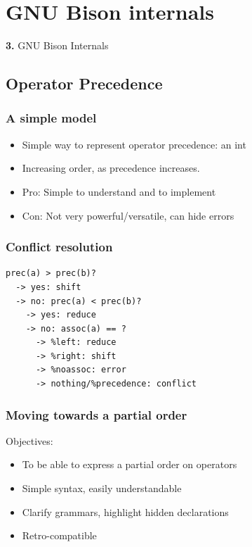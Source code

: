 \documentclass{beamer}
\begin{document}
\section{GNU Bison internals}

\begingroup
{}
\begin{frame}
    \begin{center}
        \vspace{1cm}
        {\Huge\color{black} \textbf{3.} { GNU Bison Internals}}
    \end{center}
\end{frame}
\endgroup

\subsection{Operator Precedence}
\begin{frame}
  \frametitle{A simple model}
    \begin{itemize}
      \item Simple way to represent operator precedence: an int
      \item Increasing order, as precedence increases.
      \item Pro: Simple to understand and to implement
      \item Con: Not very powerful/versatile, can hide errors
    \end{itemize}
\end{frame}

\begin{frame}[fragile]
  \frametitle{Conflict resolution}
\begin{verbatim}
prec(a) > prec(b)?
  -> yes: shift
  -> no: prec(a) < prec(b)?
    -> yes: reduce
    -> no: assoc(a) == ?
      -> %left: reduce
      -> %right: shift
      -> %noassoc: error
      -> nothing/%precedence: conflict
\end{verbatim}
\end{frame}


\begin{frame}
  \frametitle{Moving towards a partial order}
    Objectives:
    \begin{itemize}
      \item To be able to express a partial order on operators
      \item Simple syntax, easily understandable
      \item Clarify grammars, highlight hidden declarations
      \item Retro-compatible
    \end{itemize}
\end{frame}
\end{document}
